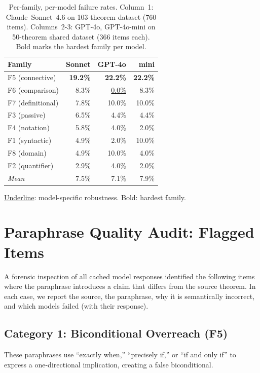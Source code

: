 \documentclass{article}
\begin{document}
\begin{table}[h]
\centering\small
\caption{Per-family, per-model failure rates.
Column~1: Claude~Sonnet~4.6 on 103-theorem dataset (760 items).
Columns~2-3: GPT-4o, GPT-4o-mini on 50-theorem shared dataset (366 items each).
Bold marks the hardest family per model.}
\begin{tabular}{p{3.0cm}rrr}
\toprule
Family & Sonnet & GPT-4o & mini \\
\midrule
F5 (connective) & \textbf{19.2\%} & \textbf{22.2\%} & \textbf{22.2\%} \\
F6 (comparison) & 8.3\%  & \underline{0.0\%}  & 8.3\%  \\
F7 (definitional) & 7.8\% & 10.0\% & 10.0\% \\
F3 (passive)    & 6.5\%  & 4.4\%  & 4.4\%  \\
F4 (notation)   & 5.8\%  & 4.0\%  & 2.0\%  \\
F1 (syntactic)  & 4.9\%  & 2.0\%  & 10.0\% \\
F8 (domain)     & 4.9\%  & 10.0\% & 4.0\%  \\
F2 (quantifier) & 2.9\%  & 4.0\%  & 2.0\%  \\
\midrule
\textit{Mean}   & 7.5\%  & 7.1\%  & 7.9\%  \\
\bottomrule
\end{tabular}
{\small \underline{Underline}: model-specific robustness. Bold: hardest family.}
\end{table}

\section{Paraphrase Quality Audit: Flagged Items}
\label{app:quality}

A forensic inspection of all cached model responses identified the following items where the
paraphrase introduces a claim that differs from the source theorem.
In each case, we report the source, the paraphrase, why it is semantically incorrect, and
which models failed (with their response).

\subsection*{Category 1: Biconditional Overreach (F5)}

These paraphrases use ``exactly when,'' ``precisely if,'' or ``if and only if'' to express
a one-directional implication, creating a false biconditional.
\end{document}
